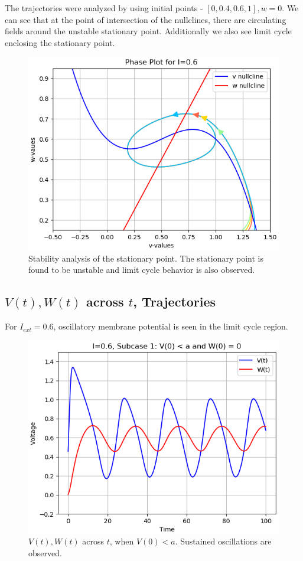 \documentclass[12pt,a4paper]{article}
\begin{document}
	The trajectories were analyzed by using initial points - $[0, 0.4, 0.6, 1], w=0$. We can see that at the point of intersection of the nullclines, there are circulating fields around the unstable stationary point. Additionally we also see limit cycle enclosing the stationary point.

	\begin{figure}[H]
	\centering
	\includegraphics[scale=0.6]{images/Figure_6.png}
	\caption{Stability analysis of the stationary point. The stationary point is found to be unstable and limit cycle behavior is also observed.}
	\end{figure}

\subsection{$V(t), W(t)$ across $t$, Trajectories}
	For $I_{ext}=0.6$, oscillatory membrane potential is seen in the limit cycle region.
	\begin{figure}[H]
	\centering
	\includegraphics[scale=0.6]{images/Figure_7.png}
	\caption{$V(t), W(t)$ across $t$, when $V(0)<a$. Sustained oscillations are observed.}
	\end{figure}
\end{document}
